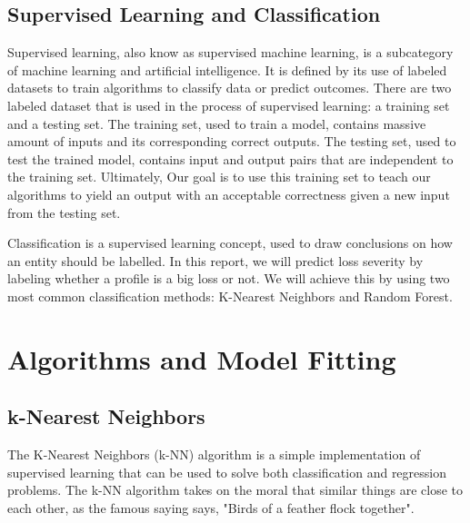 \documentclass[12pt]{article} %
\theoremstyle{definition}
\begin{document}
\subsection{Supervised Learning and Classification}
Supervised learning, also know as supervised machine learning, is a subcategory of machine learning and artificial intelligence\cite{ibm_cloud_education_2020}. It is defined by its use of labeled datasets to train algorithms to classify data or predict outcomes\cite{ibm_cloud_education_2020}. There are two labeled dataset that is used in the process of supervised learning: a training set and a testing set. The training set, used to train a model, contains massive amount of inputs and its corresponding correct outputs. The testing set, used to test the trained model, contains input and output pairs that are independent to the training set. Ultimately, Our goal is to use this training set to teach our algorithms to yield an output with an acceptable correctness given a new input from the testing set\cite{brownlee_2020}.

\vspace{\baselineskip}
Classification is a supervised learning concept, used to draw conclusions on how an entity should be labelled\cite{ibm_cloud_education_2020}. In this report, we will predict loss severity by labeling whether a profile is a big loss or not. We will achieve this by using two most common classification methods: K-Nearest Neighbors and Random Forest.

\newpage
\section{Algorithms and Model Fitting}

\subsection{k-Nearest Neighbors}
The K-Nearest Neighbors (k-NN) algorithm is a simple implementation of supervised learning that can be used to solve both classification and regression problems. The k-NN algorithm takes on the moral that similar things are close to each other, as the famous saying says, "Birds of a feather flock together".
\end{document}
